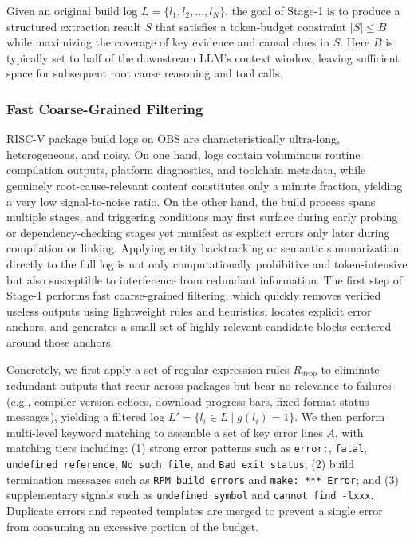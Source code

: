 \documentclass[sigconf]{acmart}
\begin{document}
Given an original build log $L = \{l_1, l_2, \ldots, l_N\}$, the goal of Stage-1 is to produce a structured extraction result $S$ that satisfies a token-budget constraint $|S| \leq B$ while maximizing the coverage of key evidence and causal clues in $S$. Here $B$ is typically set to half of the downstream LLM's context window, leaving sufficient space for subsequent root cause reasoning and tool calls.

\subsubsection{Fast Coarse-Grained Filtering}

RISC-V package build logs on OBS are characteristically ultra-long, heterogeneous, and noisy. On one hand, logs contain voluminous routine compilation outputs, platform diagnostics, and toolchain metadata, while genuinely root-cause-relevant content constitutes only a minute fraction, yielding a very low signal-to-noise ratio. On the other hand, the build process spans multiple stages, and triggering conditions may first surface during early probing or dependency-checking stages yet manifest as explicit errors only later during compilation or linking. Applying entity backtracking or semantic summarization directly to the full log is not only computationally prohibitive and token-intensive but also susceptible to interference from redundant information. The first step of Stage-1 performs fast coarse-grained filtering, which quickly removes verified useless outputs using lightweight rules and heuristics, locates explicit error anchors, and generates a small set of highly relevant candidate blocks centered around those anchors.

Concretely, we first apply a set of regular-expression rules $R_{drop}$ to eliminate redundant outputs that recur across packages but bear no relevance to failures (e.g., compiler version echoes, download progress bars, fixed-format status messages), yielding a filtered log $L' = \{l_i \in L \mid g(l_i) = 1\}$. We then perform multi-level keyword matching to assemble a set of key error lines $A$, with matching tiers including: (1) strong error patterns such as \texttt{error:}, \texttt{fatal}, \texttt{undefined reference}, \texttt{No such file}, and \texttt{Bad exit status}; (2) build termination messages such as \texttt{RPM build errors} and \texttt{make: *** Error}; and (3) supplementary signals such as \texttt{undefined symbol} and \texttt{cannot find -lxxx}. Duplicate errors and repeated templates are merged to prevent a single error from consuming an excessive portion of the budget.
\end{document}
